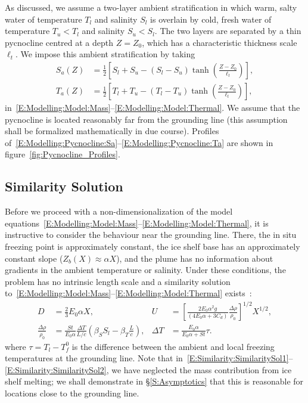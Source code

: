 \documentclass[openacc]{rsproca_new}%
\begin{document}
As discussed, we assume a two-layer ambient stratification in which warm, salty water of temperature $T_l$ and salinity $S_l$ is overlain by cold, fresh water of temperature $T_u < T_l$ and salinity $S_u < S_l$. The two layers are separated by a thin pycnocline centred at a depth $Z = Z_0$, which has a characteristic thickness scale $\ell_t$. We impose this ambient stratification by taking
\begin{align}
S_a(Z) &= \frac{1}{2}\left[S_l + S_u - (S_l - S_u)\tanh\left(\frac{Z - Z_0}{\ell_t}\right)\right],\label{E:Modelling:Pycnocline:Sa}\\
T_a(Z) &= \frac{1}{2}\left[T_l + T_u - (T_l - T_u)\tanh\left(\frac{Z - Z_0}{\ell_t}\right)\right],\label{E:Modelling:Pycnocline:Ta}
\end{align}
in~\eqref{E:Modelling:Model:Mass}--\eqref{E:Modelling:Model:Thermal}. We assume that the pycnocline is located reasonably far from the grounding line (this assumption shall be formalized mathematically in due course). Profiles of~\eqref{E:Modelling:Pycnocline:Sa}--\eqref{E:Modelling:Pycnocline:Ta} are shown in figure~\ref{fig:Pycnocline_Profiles}.

\subsection{Similarity Solution}\label{S:Model:SimilaritySolution}
Before we proceed with a non-dimensionalization of the model equations~\eqref{E:Modelling:Model:Mass}--\eqref{E:Modelling:Model:Thermal}, it is instructive to consider the behaviour near the grounding line. There, the in situ freezing point is approximately constant, the ice shelf base has an approximately constant slope ($Z_b(X) \approx \alpha X$), and the plume has no information about gradients in the ambient temperature or salinity. Under these conditions, the problem has no intrinsic length scale and a similarity solution to~\eqref{E:Modelling:Model:Mass}--\eqref{E:Modelling:Model:Thermal} exists~\citep{Magorrian2016JGeoResOcean}:
\begin{align}
D &= \frac{2}{3}E_0 \alpha X, & U &= \left[\frac{2E_0 \alpha^2 g}{\left(4E_0 \alpha + 3 C_d\right)} \frac{\Delta \rho}{\rho_0}\right]^{1/2}X^{1/2},\label{E:Similarity:SimilaritySol1}\\
 \frac{\Delta \rho}{\rho_0} &= \frac{St}{E_0 \alpha}\frac{\Delta T}{L/c}\left(\beta_S S_l - \beta_T \frac{L}{c}\right), & \Delta T &= \frac{E_0 \alpha}{E_0 \alpha + St}\tau.\label{E:Similarity:SimilaritySol2}
\end{align}
where $\tau = T_l - T_{f}^0$ is the difference between the ambient and local freezing temperatures at the grounding line.  Note that in~\eqref{E:Similarity:SimilaritySol1}--\eqref{E:Similarity:SimilaritySol2}, we have neglected the mass contribution from ice shelf melting; we shall demonstrate in \S\ref{S:Asymptotics} that this is reasonable for locations close to the grounding line.
\end{document}
